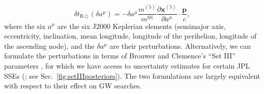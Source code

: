 \documentclass[iop,apj,twocolappendix]{emulateapj}
\begin{document}
\begin{itemize}
\begin{equation}
\label{eq:orbitperturb}
    \delta t_{\mathrm{R}\odot}(\delta a^\mu) = -\delta a^\mu
    \frac{m^{(5)}}{m^\mathrm{SS}} \frac{\partial \mathbf{x}^{(5)}}{\partial a^\mu} \cdot \frac{\mathbf{p}}{c},
\end{equation}
%
where the six $a^\mu$ are the six J2000 Keplerian elements (semimajor axis, eccentricity, inclination, mean longitude, longitude of the perihelion, longitude of the ascending node), and the $\delta a^\mu$ are their perturbations. Alternatively, we can formulate the perturbations in terms of Brouwer and Clemence's ``Set III'' parameters \citep{1961mcm..book.....B}, for which we have access to uncertainty estimates for certain JPL SSEs (\citealt{de434,de438}; see Sec.\ \ref{fig:setIIIposteriors}). The two formulations are largely equivalent with respect to their effect on GW searches.


\end{itemize}
\end{document}
